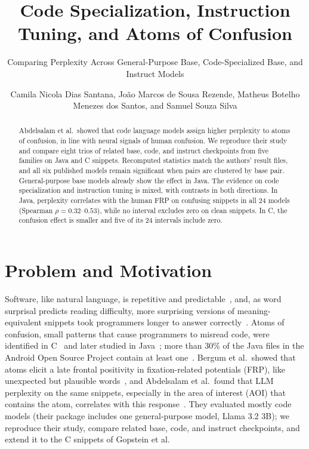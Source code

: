 \documentclass[sigconf,nonacm]{acmart}
\begin{document}
\title{Code Specialization, Instruction Tuning, and Atoms of Confusion}
\subtitle{Comparing Perplexity Across General-Purpose Base, Code-Specialized Base, and Instruct Models} 

\author{Camila Nicola Dias Santana, João Marcos de Sousa Rezende, Matheus Botelho Menezes dos Santos, and Samuel Souza Silva}
\renewcommand{\shortauthors}{Santana, Rezende, Santos, and Silva}

\begin{abstract}
Abdelsalam et al.\ showed that code language models assign higher perplexity to atoms of confusion, in line with neural signals of human confusion.
We reproduce their study and compare eight trios of related base, code, and instruct checkpoints from five families on Java and C snippets.
Recomputed statistics match the authors' result files, and all six published models remain significant when pairs are clustered by base pair.
General-purpose base models already show the effect in Java. The evidence on code specialization and instruction tuning is mixed, with contrasts in both directions.
In Java, perplexity correlates with the human FRP on confusing snippets in all 24 models (Spearman $\rho = 0.32$--$0.53$), while no interval excludes zero on clean snippets.
In C, the confusion effect is smaller and five of its 24 intervals include zero.
\end{abstract}

\maketitle

\section{Problem and Motivation}
Software, like natural language, is repetitive and predictable~\cite{hindle2012}, and, as word surprisal predicts reading difficulty, more surprising versions of meaning-equivalent snippets took programmers longer to answer correctly~\cite{casalnuovo2020}.
Atoms of confusion, small patterns that cause programmers to misread code, were identified in C~\cite{gopstein2017} and later studied in Java~\cite{langhout2021}; more than 30\% of the Java files in the Android Open Source Project contain at least one~\cite{tabosa2024}.
Bergum et al.\ showed that atoms elicit a late frontal positivity in fixation-related potentials (FRP), like unexpected but plausible words~\cite{bergum2025}, and Abdelsalam et al.\ found that LLM perplexity on the same snippets, especially in the area of interest (AOI) that contains the atom, correlates with this response~\cite{abdelsalam2026}.
They evaluated mostly code models (their package includes one general-purpose model, Llama 3.2 3B); we reproduce their study, compare related base, code, and instruct checkpoints, and extend it to the C snippets of Gopstein et al.
\end{document}

